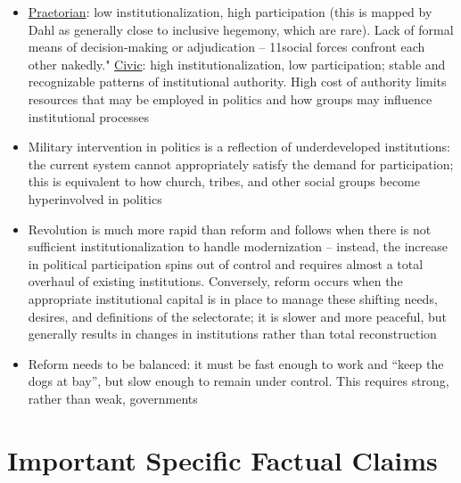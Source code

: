 \documentclass[12pt]{article}
\begin{document}
\begin{itemize}[leftmargin=*, itemsep=4pt]
    \item \underline{Praetorian}: low institutionalization, high participation (this is mapped by Dahl as generally close to inclusive hegemony, which are rare). Lack of formal means of decision-making or adjudication -- 11social forces confront each other nakedly."  \underline{Civic}: high institutionalization, low participation; stable and recognizable patterns of institutional authority. High cost of authority limits resources that may be employed in politics and how groups may influence institutional processes
    \item Military intervention in politics is a reflection of underdeveloped institutions: the current system cannot appropriately satisfy the demand for participation; this is equivalent to how church, tribes, and other social groups become hyperinvolved in politics
    \item Revolution is much more rapid than reform and follows when there is not sufficient institutionalization to handle modernization -- instead, the increase in political participation spins out of control and requires almost a total overhaul of existing institutions. Conversely, reform occurs when the appropriate institutional capital is in place to manage these shifting needs, desires, and definitions of the selectorate; it is slower and more peaceful, but generally results in changes in institutions rather than total reconstruction
    \item Reform needs to be balanced: it must be fast enough to work and ``keep the dogs at bay'', but slow enough to remain under control. This requires strong, rather than weak, governments
\end{itemize}


\section{Important Specific Factual Claims}
\end{document}
